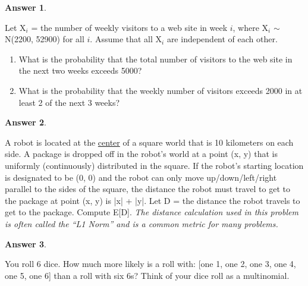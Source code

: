 \documentclass[12pt]{article}
\renewcommand{\(}{\left(}
\renewcommand{\)}{\right)}
\theoremstyle{definition}
\newtheorem*{answer}{Answer}
\begin{document}
\begin{enumerate}
{    \begin{shaded}
    \begin{answer}
    
    \end{answer}
    \end{shaded}
    
    \newpage
    \item Let X$_i$ = the number of weekly visitors to a web site in week $i$, where X$_i$ $\sim$ N(2200, 52900) for all $i$. Assume that all X$_i$ are independent of each other.
    \begin{enumerate}
        \item What is the probability that the total number of visitors to the web site in the next two weeks exceeds 5000?
        \item What is the probability that the weekly number of visitors exceeds 2000 in at least 2 of the next 3 weeks?
    \end{enumerate}
    
    \begin{shaded}
    \begin{answer}
    
    \end{answer}
    \end{shaded}
    \newpage
    \item A robot is located at the \underline{center} of a square world that is 10 kilometers on each side. A package is dropped off in the robot's world at a point (x, y) that is uniformly (continuously) distributed in the square. If the robot's starting location is designated to be (0, 0) and the robot can only move up/down/left/right parallel to the sides of the square, the distance the robot must travel to get to the package at point (x, y) is |x| + |y|. Let D = the distance the robot travels to get to the package. Compute E[D]. \textit{The distance calculation used in this problem is often called the ``L1 Norm'' and is a common metric for many problems.}
    
    \begin{shaded}
    \begin{answer}
    
    \end{answer}
    \end{shaded}
    \newpage
    \item You roll 6 dice. How much more likely is a roll with: [one 1, one 2, one 3, one 4, one 5, one 6] than a roll with six 6s? Think of your dice roll as a multinomial.
    
}
\end{enumerate}
\end{document}
